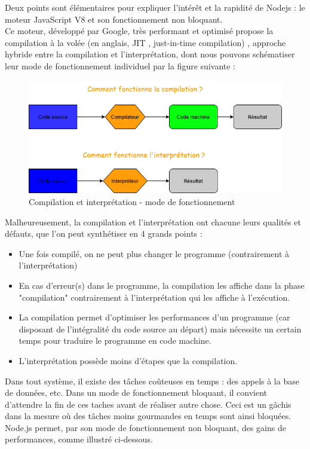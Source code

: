 Deux points sont élémentaires pour expliquer l'intérêt et la rapidité de Nodejs : le moteur JavaScript V8 et son fonctionnement non bloquant. \\

Ce moteur, développé par Google, très performant et optimisé propose la compilation à la volée (en anglais, JIT , just-in-time compilation) , approche hybride entre la compilation et l'interprétation, dont nous pouvons schématiser leur mode de fonctionnement individuel par la figure suivante :
\begin{figure}[H]
    \includegraphics[width=\textwidth,height=0.2\textheight,keepaspectratio]{images/compilationVSinterpretation.png}
    \centering
    \caption{Compilation et interprétation - mode de fonctionnement}
\end{figure}

Malheureusement, la compilation et l'interprétation ont chacune leurs qualités et défauts, que l'on peut synthétiser en 4 grands points :
\begin{itemize}
    \item Une fois compilé, on ne peut plus changer le programme (contrairement à l'interprétation)
    \item En cas d'erreur(s) dans le programme, la compilation les affiche dans la phase "compilation" contrairement à l'interprétation qui les affiche à l'exécution. 
    \item La compilation permet d'optimiser les performances d'un programme (car disposant de l'intégralité du code source au départ) mais nécessite un certain temps pour traduire le programme en code machine.
    \item L'interprétation possède moins d'étapes que la compilation.
\end{itemize}

Dans tout système, il existe des tâches coûteuses en temps : des appels à la base de données, etc.
Dans un mode de fonctionnement bloquant, il convient d'attendre la fin de ces taches avant de réaliser autre chose. Ceci est un gâchis dans la mesure où des tâches moins gourmandes en temps sont ainsi bloquées. Node.js permet, par son mode de fonctionnement non bloquant, des gains de performances, comme illustré ci-dessous.

